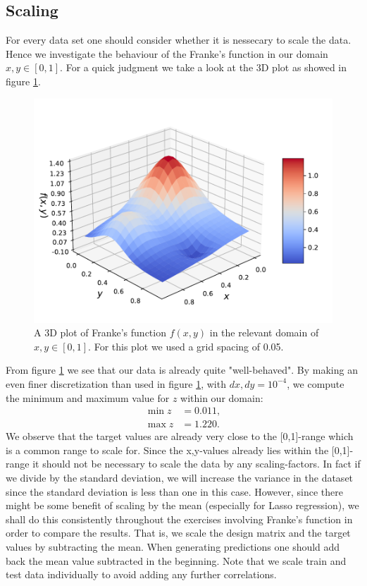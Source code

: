 \documentclass[norsk,a4paper,12pt]{scrartcl}
\begin{document}
\subsection{Scaling}
For every data set one should consider whether it is nessecary to scale the data. Hence we investigate the behaviour of the Franke's function in our domain $x,y \in [0,1]$. For a quick judgment we take a look at the 3D plot as showed in figure \ref{fig:Franke3D}.
\begin{figure}[H]
    \centering
    \includegraphics[width = \linewidth]{figures/Frankefunction_3D.pdf}
    \caption{A 3D plot of Franke's function $f(x,y)$ in the relevant domain of $x,y \in [0,1]$. For this plot we used a grid spacing of 0.05.}
    \label{fig:Franke3D}
\end{figure}
From figure \ref{fig:Franke3D} we see that our data is already quite "well-behaved". By making an even finer discretization than used in figure \ref{fig:Franke3D}, with $dx, dy = 10^{-4}$, we compute the minimum and maximum value for $z$ within our domain:
\begin{align*}
    \min{z} &= 0.011, \\
    \max{z} &= 1.220. 
\end{align*}
We observe that the target values are already very close to the [0,1]-range which is a common range to scale for. Since the x,y-values already lies within the [0,1]-range it should not be necessary to scale the data by any scaling-factors. In fact if we divide by the standard deviation, we will increase the variance in the dataset since the standard deviation is less than one in this case. However, since there might be some benefit of scaling by the mean (especially for Lasso regression), we shall do this consistently throughout the exercises involving Franke's function in order to compare the results. That is, we scale the design matrix and the target values by subtracting the mean. When generating predictions one should add back the mean value subtracted in the beginning. Note that we scale train and test data individually to avoid adding any further correlations.
\end{document}
